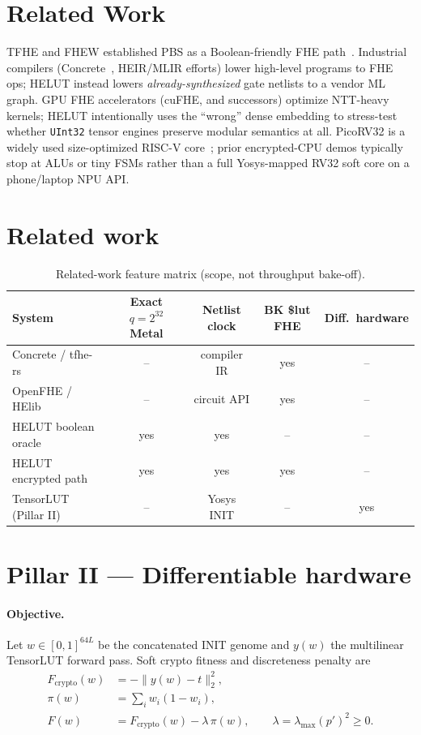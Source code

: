 \documentclass[11pt,a4paper]{article}
\begin{document}
\section{Related Work}
\label{sec:related}

TFHE and FHEW established PBS as a Boolean-friendly FHE
path~\cite{chillotti2020tfhe,ducas2015fhew}.
Industrial compilers (Concrete~\cite{concrete}, HEIR/MLIR efforts) lower high-level
programs to FHE ops; HELUT instead lowers \emph{already-synthesized} gate netlists
to a vendor ML graph.
GPU FHE accelerators (cuFHE, and successors) optimize NTT-heavy kernels;
HELUT intentionally uses the ``wrong'' dense embedding to stress-test whether
\texttt{UInt32} tensor engines preserve modular semantics at all.
PicoRV32 is a widely used size-optimized RISC-V
core~\cite{picorv32}; prior encrypted-CPU demos typically stop at ALUs or
tiny FSMs rather than a full Yosys-mapped RV32 soft core on a phone/laptop NPU
API.

\section{Related work}
\label{sec:related}

\begin{table}[t]
\centering
\small
\begin{tabular}{@{}lcccc@{}}
\toprule
System & Exact $q{=}2^{32}$ Metal & Netlist clock & BK \$lut FHE & Diff.\ hardware \\
\midrule
Concrete / tfhe-rs & -- & compiler IR & yes & -- \\
OpenFHE / HElib & -- & circuit API & yes & -- \\
HELUT boolean oracle & yes & yes & -- & -- \\
HELUT encrypted path & yes & yes & yes & -- \\
TensorLUT (Pillar II) & -- & Yosys INIT & -- & yes \\
\bottomrule
\end{tabular}
\caption{Related-work feature matrix (scope, not throughput bake-off).}
\label{tab:related}
\end{table}

\section{Pillar II --- Differentiable hardware}
\label{sec:pillar2}

\paragraph{Objective.}
Let $w\in[0,1]^{64L}$ be the concatenated INIT genome and $y(w)$ the multilinear
TensorLUT forward pass. Soft crypto fitness and discreteness penalty are
\begin{align}
  F_{\mathrm{crypto}}(w)
  &= -\lVert y(w)-t\rVert_2^2, \\
  \pi(w)
  &= \sum_i w_i(1-w_i), \\
  F(w)
  &= F_{\mathrm{crypto}}(w)-\lambda\,\pi(w),
  \qquad \lambda=\lambda_{\max}(p')^2\ge 0.
\end{align}
\end{document}
